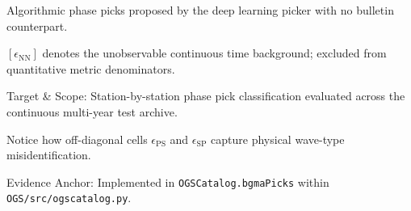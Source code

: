 \begin{table}[htbp]
\begin{threeparttable}
\begin{tablenotes}[flushleft]
      \item[b] [Model Forecast / Hypothesis] Algorithmic phase picks proposed by the deep learning picker with no bulletin counterpart.
      \item[c] $[\epsilon_{\mathrm{NN}}]$ denotes the unobservable continuous time background; excluded from quantitative metric denominators.
      \item Target \& Scope: Station-by-station phase pick classification evaluated across the continuous multi-year test archive.
      \item Notice how off-diagonal cells $\epsilon_{\mathrm{PS}}$ and $\epsilon_{\mathrm{SP}}$ capture physical wave-type misidentification.
      \item Evidence Anchor: Implemented in \texttt{OGSCatalog.bgmaPicks} within \texttt{OGS/src/ogscatalog.py}.
    \end{tablenotes}
  \end{threeparttable}
\end{table}

